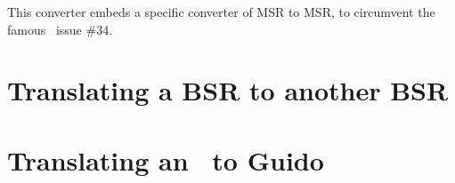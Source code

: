 This converter embeds a specific converter of MSR to MSR, to circumvent the famous \lily\ issue \#34.


\section{Translating a BSR to another BSR}


\section{Translating an \mxsrRepr\ to Guido}



